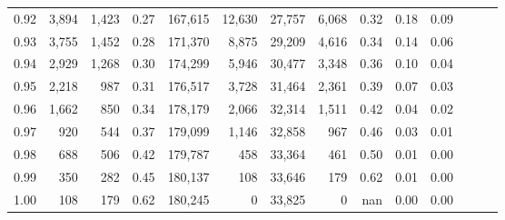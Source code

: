 \begin{tabular}{rrrrrrrrrrrrrr}
0.92 &  3,894 &  1,423 &  0.27 &  167,615 &   12,630 &  27,757 &   6,068 &  0.32 &  0.18 &      0.09 \\
0.93 &  3,755 &  1,452 &  0.28 &  171,370 &    8,875 &  29,209 &   4,616 &  0.34 &  0.14 &      0.06 \\
0.94 &  2,929 &  1,268 &  0.30 &  174,299 &    5,946 &  30,477 &   3,348 &  0.36 &  0.10 &      0.04 \\
0.95 &  2,218 &    987 &  0.31 &  176,517 &    3,728 &  31,464 &   2,361 &  0.39 &  0.07 &      0.03 \\
0.96 &  1,662 &    850 &  0.34 &  178,179 &    2,066 &  32,314 &   1,511 &  0.42 &  0.04 &      0.02 \\
0.97 &    920 &    544 &  0.37 &  179,099 &    1,146 &  32,858 &     967 &  0.46 &  0.03 &      0.01 \\
0.98 &    688 &    506 &  0.42 &  179,787 &      458 &  33,364 &     461 &  0.50 &  0.01 &      0.00 \\
0.99 &    350 &    282 &  0.45 &  180,137 &      108 &  33,646 &     179 &  0.62 &  0.01 &      0.00 \\
1.00 &    108 &    179 &  0.62 &  180,245 &        0 &  33,825 &       0 &   nan &  0.00 &      0.00 \\
\bottomrule
\end{tabular}
